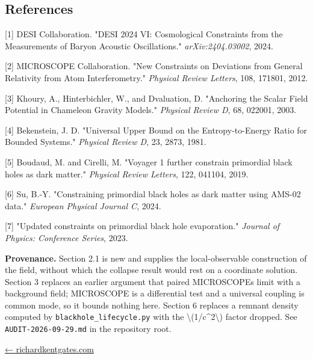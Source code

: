 \documentclass[
  10pt,
]{article}
\begin{document}
\hypertarget{references}{%
\subsection{References}\label{references}}

{[}1{]} DESI Collaboration. "DESI 2024 VI: Cosmological Constraints from
the Measurements of Baryon Acoustic Oscillations."
\emph{arXiv:2404.03002}, 2024.

{[}2{]} MICROSCOPE Collaboration. "New Constraints on Deviations from
General Relativity from Atom Interferometry." \emph{Physical Review
Letters}, 108, 171801, 2012.

{[}3{]} Khoury, A., Hinterbichler, W., and Dvaluation, D. "Anchoring the
Scalar Field Potential in Chameleon Gravity Models." \emph{Physical
Review D}, 68, 022001, 2003.

{[}4{]} Bekenstein, J. D. "Universal Upper Bound on the
Entropy-to-Energy Ratio for Bounded Systems." \emph{Physical Review D},
23, 2873, 1981.

{[}5{]} Boudaud, M. and Cirelli, M. "Voyager 1 further constrain
primordial black holes as dark matter." \emph{Physical Review Letters},
122, 041104, 2019.

{[}6{]} Su, B.-Y. "Constraining primordial black holes as dark matter
using AMS-02 data." \emph{European Physical Journal C}, 2024.

{[}7{]} "Updated constraints on primordial black hole evaporation."
\emph{Journal of Physics: Conference Series}, 2023.

\textbf{Provenance.} Section 2.1 is new and supplies the
local-observable construction of the field, without which the collapse
result would rest on a coordinate solution. Section 3 replaces an
earlier argument that paired MICROSCOPE\textquotesingle s limit with a
background field; MICROSCOPE is a differential test and a universal
coupling is common mode, so it bounds nothing here. Section 6 replaces a
remnant density computed by \texttt{blackhole\_lifecycle.py} with the
\textbackslash(1/c\^{}2\textbackslash) factor dropped. See
\texttt{AUDIT-2026-09-29.md} in the repository root.

\href{https://richardkentgates.com/}{← richardkentgates.com}
\end{document}
